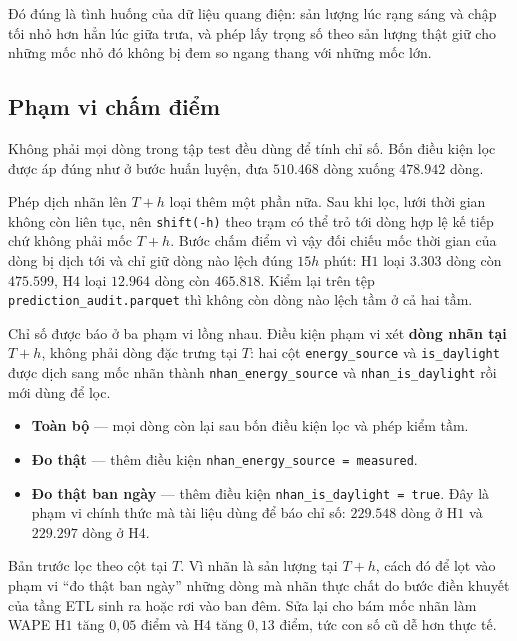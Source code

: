 \documentclass[12pt, a4paper]{report}
\begin{document}
Đó đúng là tình huống của dữ liệu quang điện: sản lượng lúc rạng sáng và chập tối nhỏ hơn hẳn
lúc giữa trưa, và phép lấy trọng số theo sản lượng thật giữ cho những mốc nhỏ đó không bị đem so
ngang thang với những mốc lớn.


\FloatBarrier
\subsection{Phạm vi chấm điểm}

Không phải mọi dòng trong tập test đều dùng để tính chỉ số. Bốn điều kiện lọc được áp đúng như
ở bước huấn luyện, đưa $510.468$ dòng xuống $478.942$ dòng.

Phép dịch nhãn lên $T{+}h$ loại thêm một phần nữa. Sau khi lọc, lưới thời gian không còn liên
tục, nên \texttt{shift(-h)} theo trạm có thể trỏ tới dòng hợp lệ kế tiếp chứ không phải mốc
$T{+}h$. Bước chấm điểm vì vậy đối chiếu mốc thời gian của dòng bị dịch tới và chỉ giữ dòng
nào lệch đúng $15h$ phút: H$1$ loại $3.303$ dòng còn $\mathbf{475.599}$, H$4$ loại $12.964$
dòng còn $\mathbf{465.818}$. Kiểm lại trên tệp \texttt{prediction\_audit.parquet} thì không còn
dòng nào lệch tầm ở cả hai tầm.

Chỉ số được báo ở ba phạm vi lồng nhau. Điều kiện phạm vi xét \textbf{dòng nhãn tại $T{+}h$},
không phải dòng đặc trưng tại $T$: hai cột \texttt{energy\_source} và \texttt{is\_daylight} được dịch
sang mốc nhãn thành \texttt{nhan\_energy\_source} và \texttt{nhan\_is\_daylight} rồi mới dùng để lọc.

\begin{itemize}
    \item \textbf{Toàn bộ} --- mọi dòng còn lại sau bốn điều kiện lọc và phép kiểm tầm.
    \item \textbf{Đo thật} --- thêm điều kiện \texttt{nhan\_energy\_source = measured}.
    \item \textbf{Đo thật ban ngày} --- thêm điều kiện \texttt{nhan\_is\_daylight = true}. Đây là
    phạm vi chính thức mà tài liệu dùng để báo chỉ số: $229.548$ dòng ở H$1$ và $229.297$ dòng
    ở H$4$.
\end{itemize}

Bản trước lọc theo cột tại $T$. Vì nhãn là sản lượng tại $T{+}h$, cách đó để lọt vào phạm vi
``đo thật ban ngày'' những dòng mà nhãn thực chất do bước điền khuyết của tầng ETL sinh ra hoặc
rơi vào ban đêm. Sửa lại cho bám mốc nhãn làm WAPE H$1$ tăng $0{,}05$ điểm và H$4$ tăng
$0{,}13$ điểm, tức con số cũ dễ hơn thực tế.

\FloatBarrier
\end{document}

